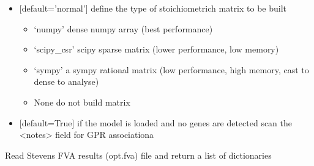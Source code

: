 \documentclass[letterpaper,10pt,english]{sphinxmanual}
\begin{document}
\begin{fulllineitems}
\begin{itemize}
\begin{itemize}
\item {} 
\sphinxAtStartPar
{} {[}default=’normal’{]} define the type of stoichiometrich matrix to be built
\begin{itemize}
\item {} 
\sphinxAtStartPar
‘numpy’ dense numpy array (best performance)

\item {} 
\sphinxAtStartPar
‘scipy\_csr’ scipy sparse matrix (lower performance, low memory)

\item {} 
\sphinxAtStartPar
‘sympy’ a sympy rational matrix (low performance, high memory, cast to dense to analyse)

\item {} 
\sphinxAtStartPar
None do not build matrix

\end{itemize}

\end{itemize}

\end{itemize}
\begin{itemize}
\item {} 
\sphinxAtStartPar
{} {[}default=True{]} if the model is loaded and no genes are detected scan the \textless{}notes\textgreater{} field for GPR associationa

\end{itemize}

\end{fulllineitems}


\begin{fulllineitems}
\label{\detokenize{modules_doc:cbmpy.CBRead.readSK_FVA}}
\pysigstartsignatures
{}
\pysigstopsignatures
\sphinxAtStartPar
Read Stevens FVA results (opt.fva) file and return a list of dictionaries

\end{fulllineitems}

\end{document}
